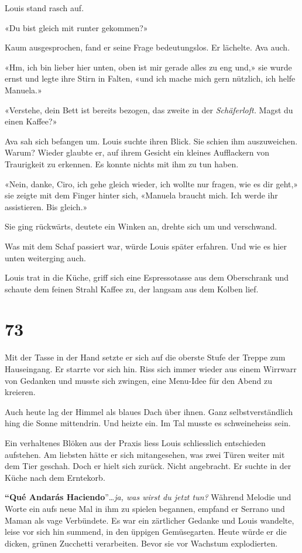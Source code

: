 Louis stand rasch auf.

«Du bist gleich mit runter gekommen?»

Kaum ausgesprochen, fand er seine Frage bedeutungslos. Er lächelte. Ava
auch.

«Hm, ich bin lieber hier unten, oben ist mir gerade alles zu eng und,»
sie wurde ernst und legte ihre Stirn in Falten, «und ich mache mich gern
nützlich, ich helfe Manuela.»

«Verstehe, dein Bett ist bereits bezogen, das zweite in der
\emph{Schäferloft.} Magst du einen Kaffee?»

Ava sah sich befangen um. Louis suchte ihren Blick. Sie schien ihm
auszuweichen. Warum? Wieder glaubte er, auf ihrem Gesicht ein kleines
Aufflackern von Traurigkeit zu erkennen. Es konnte nichts mit ihm zu tun
haben.

«Nein, danke, Ciro, ich gehe gleich wieder, ich wollte nur fragen, wie
es dir geht,» sie zeigte mit dem Finger hinter sich, «Manuela braucht
mich. Ich werde ihr assistieren. Bis gleich.»

Sie ging rückwärts, deutete ein Winken an, drehte sich um und
verschwand.

Was mit dem Schaf passiert war, würde Louis später erfahren. Und wie es
hier unten weiterging auch.

Louis trat in die Küche, griff sich eine Espressotasse aus dem
Oberschrank und schaute dem feinen Strahl Kaffee zu, der langsam aus dem
Kolben lief.

\chapter{73}\label{section-73}

Mit der Tasse in der Hand setzte er sich auf die oberste Stufe der
Treppe zum Hauseingang. Er starrte vor sich hin. Riss sich immer wieder
aus einem Wirrwarr von Gedanken und musste sich zwingen, eine Menu-Idee
für den Abend zu kreieren.

Auch heute lag der Himmel als blaues Dach über ihnen. Ganz
selbstverständlich hing die Sonne mittendrin. Und heizte ein. Im Tal
musste es schweineheiss sein.

Ein verhaltenes Blöken aus der Praxis liess Louis schliesslich
entschieden aufstehen. Am liebsten hätte er sich mitangesehen, was zwei
Türen weiter mit dem Tier geschah. Doch er hielt sich zurück. Nicht
angebracht. Er suchte in der Küche nach dem Erntekorb.

\textbf{``Qué Andarás Haciendo}''\ldots{}\emph{ja, was wirst du jetzt
tun?} Während Melodie und Worte ein aufs neue Mal in ihm zu spielen
begannen, empfand er Serrano und Maman als vage Verbündete. Es war ein
zärtlicher Gedanke und Louis wandelte, leise vor sich hin summend, in
den üppigen Gemüsegarten. Heute würde er die dicken, grünen Zucchetti
verarbeiten. Bevor sie vor Wachstum explodierten.

